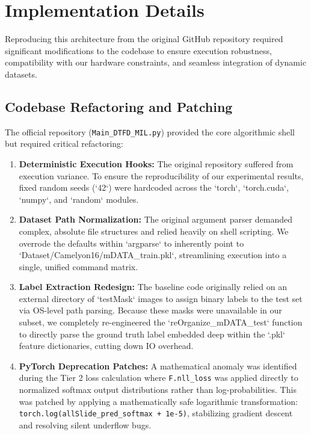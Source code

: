 \documentclass[11pt,a4paper]{article}
\begin{document}
\section{Implementation Details}
Reproducing this architecture from the original GitHub repository required significant modifications to the codebase to ensure execution robustness, compatibility with our hardware constraints, and seamless integration of dynamic datasets.

\subsection{Codebase Refactoring and Patching}
The official repository (\texttt{Main\_DTFD\_MIL.py}) provided the core algorithmic shell but required critical refactoring:
\begin{enumerate}
    \item \textbf{Deterministic Execution Hooks:} The original repository suffered from execution variance. To ensure the reproducibility of our experimental results, fixed random seeds (`42`) were hardcoded across the `torch`, `torch.cuda`, `numpy`, and `random` modules.
    \item \textbf{Dataset Path Normalization:} The original argument parser demanded complex, absolute file structures and relied heavily on shell scripting. We overrode the defaults within `argparse` to inherently point to `Dataset/Camelyon16/mDATA\_train.pkl`, streamlining execution into a single, unified command matrix.
    \item \textbf{Label Extraction Redesign:} The baseline code originally relied on an external directory of `testMask` images to assign binary labels to the test set via OS-level path parsing. Because these masks were unavailable in our subset, we completely re-engineered the `reOrganize\_mDATA\_test` function to directly parse the ground truth label embedded deep within the `.pkl` feature dictionaries, cutting down IO overhead.
    \item \textbf{PyTorch Deprecation Patches:} A mathematical anomaly was identified during the Tier 2 loss calculation where \texttt{F.nll\_loss} was applied directly to normalized softmax output distributions rather than log-probabilities. This was patched by applying a mathematically safe logarithmic transformation: \texttt{torch.log(allSlide\_pred\_softmax + 1e-5)}, stabilizing gradient descent and resolving silent underflow bugs.
\end{enumerate}
\end{document}

